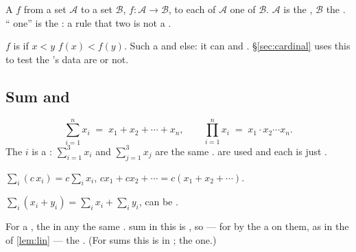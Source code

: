 A \emph{} $f$ from a set $\mathcal{A}$ to a set $\mathcal{B}$, 
$f:\mathcal{A}\to\mathcal{B}$,  to each  of $\mathcal{A}$ 
one  of $\mathcal{B}$. $\mathcal{A}$ is the \emph{},
$\mathcal{B}$ the \emph{}. `` one'' is the  : a rule
that   two  is not a .

\begin{definition}[Monotone]
$f$ is \emph{ } if $x<y$  $f(x)<f(y)$. Such a 
  and  else: it can  and   .
§\ref{sec:cardinal} uses  this  to test  the 's
 data are  or not.
\end{definition}

\subsection{Sum and  }

\[
\sum_{i=1}^{n} x_i \;=\; x_1+x_2+\cdots+x_n,
\qquad
\prod_{i=1}^{n} x_i \;=\; x_1 \cdot x_2 \cdots x_n .
\]
The  $i$ is a \emph{}: $\sum_{i=1}^{3}x_i$ and $\sum_{j=1}^{3}x_j$ are
the same .    are used  and each is just
   .

$\sum_i (c\,x_i) = c\sum_i x_i$,  $cx_1+cx_2+\cdots = c(x_1+x_2+\cdots)$.

$\sum_i (x_i+y_i) = \sum_i x_i + \sum_i y_i$,   can be .

 For a \emph{}
,  the  in any   the same .  sum in this
 is , so    --- for   
by the  a   on them, as in the  of \cref{lem:lin} --- 
 the . (For  sums this is  in ; the  
 one.)

